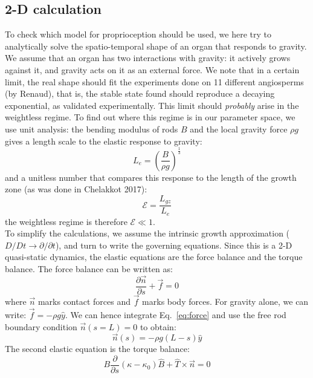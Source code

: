 \documentclass[a4paper, 11pt]{article}
\begin{document}
\subsection*{2-D calculation}
To check which model for proprioception should be used, we here try to analytically solve the spatio-temporal shape of an organ that responds to gravity. We assume that an organ has two interactions with gravity: it actively grows against it, and gravity acts on it as an external force. We note that in a certain limit, the real shape should fit the experiments done on 11 different angiosperms (by Renaud), that is, the stable state found should reproduce a decaying exponential, as validated experimentally. This limit should \emph{probably} arise in the weightless regime. To find out where this regime is in our parameter space, we use unit analysis: the bending modulus of rods $B$ and the local gravity force $\rho g$ gives a length scale to the elastic response to gravity:
\begin{equation}
    L_{e}=\left(\frac{B}{\rho g}\right)^{\frac{1}{3}}
\end{equation}
and a unitless number that compares this response to the length of the growth zone (as was done in Chelakkot 2017):
\begin{equation}
    \mathcal{E}=\frac{L_{gz}}{L_e}
\end{equation}
the weightless regime is therefore $\mathcal{E}\ll 1$.\\
\noindent To simplify the calculations, we assume the intrinsic growth approximation ($D/Dt\rightarrow \partial/\partial t$), and turn to write the governing equations. Since this is a 2-D quasi-static dynamics, the elastic equations are the force balance and the torque balance. The force balance can be written as:
\begin{equation}
    \frac{\partial\vec{n}}{\partial s}+\vec{f}=0
\end{equation}
where $\vec{n}$ marks contact forces and $\vec{f}$ marks body forces. For gravity alone, we can write: $\vec{f}=-\rho g \hat{y}$. We can hence integrate Eq.~\ref{eq:force} and use the free rod boundary condition $\vec{n}(s=L)=0$ to obtain:
\begin{equation}\label{eq:force}
    \vec{n}(s)=-\rho g (L-s)\hat{y}
\end{equation}
The second elastic equation is the torque balance:
\begin{equation}\label{eq:torque}
    B\frac{\partial}{\partial s}(\kappa-\kappa_0)\hat{B}+\hat{T}\times\vec{n}=0
\end{equation}
\end{document}
